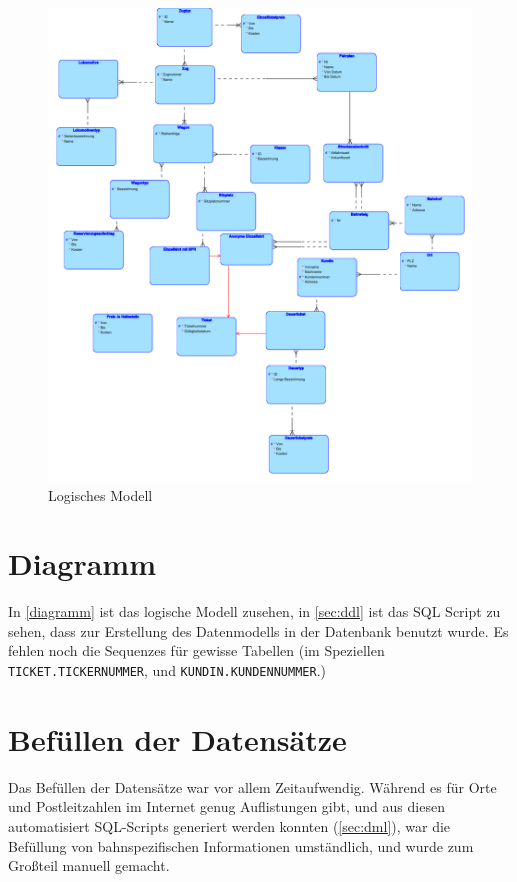 \begin{figure}[h]
    \caption{Logisches Modell}
    \centering
    \includegraphics[width=1\textwidth]{logical}
\end{figure}\label{diagramm}
\section{Diagramm}
\label{section:Diagramm}

In \ref{diagramm} ist das logische Modell zusehen, in \ref{sec:ddl} ist das SQL Script zu sehen, dass zur Erstellung
des Datenmodells in der Datenbank benutzt wurde. Es fehlen noch die Sequenzes für gewisse
Tabellen (im Speziellen \texttt{TICKET.TICKERNUMMER}, und \texttt{KUNDIN.KUNDENNUMMER}.)
\section{Befüllen der Datensätze}
Das Befüllen der Datensätze war vor allem Zeitaufwendig. Während es für Orte und Postleitzahlen
im Internet genug Auflistungen gibt, und aus diesen automatisiert SQL-Scripts generiert werden
konnten (\ref{sec:dml}), war die Befüllung von bahnspezifischen Informationen umständlich, und wurde
zum Großteil manuell gemacht.

